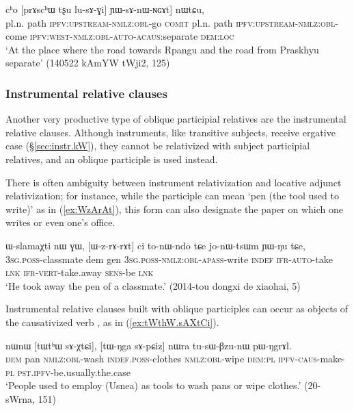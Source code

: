 \begin{exe}
\ex \label{ex:YWsAnWNGAt}
\gll   [[rpɤŋgɯ tʂu lu-sɤx-ɕe] cʰo [prɤscʰɯ tʂu lu-sɤ-ɣi] ɲɯ-sɤ-nɯ-ɴɢɤt] nɯtɕu, \\
pl.n.  path \textsc{ipfv}:\textsc{upstream}-\textsc{nmlz}:\textsc{obl}-go \textsc{comit} pl.n.  path \textsc{ipfv}:\textsc{upstream}-\textsc{nmlz}:\textsc{obl}-come \textsc{ipfv}:\textsc{west}-\textsc{nmlz}:\textsc{obl}-\textsc{auto}-\textsc{acaus}:separate \textsc{dem}:\textsc{loc} \\
\glt `At the place where the road towards Rpangu and the road from Praskhyu separate' (140522 kAmYW tWji2, 125)
\end{exe}

\subsubsection{Instrumental relative clauses} \label{sec:instrumental.participle.relatives}
Another very productive type of oblique participial relatives are the instrumental relative clauses. Although instruments, like transitive subjects, receive ergative case (§\ref{sec:instr.kW}), they cannot be relativized with subject participial relatives, and an oblique participle is used instead.

There is often ambiguity between instrument relativization and locative adjunct relativization; for instance, while the participle  can mean `pen (the tool used to write)' as in (\ref{ex:WzArAt}), this form can also designate the paper on which one writes or even one's office.

\begin{exe}
\ex \label{ex:WzArAt}
\gll ɯ-slamaχti nɯ ɣɯ, [ɯ-z-rɤ-rɤt] ci to-nɯ-ndo tɕe jo-nɯ-tsɯm ɲɯ-ŋu tɕe, \\
\textsc{3sg}.\textsc{poss}-classmate dem gen \textsc{3sg}.\textsc{poss}-\textsc{nmlz}:\textsc{obl}-\textsc{apass}-write \textsc{indef} \textsc{ifr}-\textsc{auto}-take \textsc{lnk} \textsc{ifr}-\textsc{vert}-take.away \textsc{sens}-be \textsc{lnk} \\
\glt `He took away the pen of a classmate.' (2014-tou dongxi de xiaohai, 5)
\end{exe}

Instrumental relative clauses built with oblique participles can occur as objects of the causativized verb , as in (\ref{ex:tWthW.sAXtCi}).

\begin{exe}
\ex \label{ex:tWthW.sAXtCi}
\gll nɯnɯ [tɯtʰɯ sɤ-χtɕi], [tɯ-ŋga sɤ-pɕiz] nɯra tu-sɯ-βzu-nɯ pɯ-ŋgrɤl. \\
\textsc{dem} pan \textsc{nmlz}:\textsc{obl}-wash \textsc{indef}.\textsc{poss}-clothes \textsc{nmlz}:\textsc{obl}-wipe \textsc{dem}:\textsc{pl} \textsc{ipfv}-\textsc{caus}-make-\textsc{pl} \textsc{pst}.\textsc{ipfv}-be.usually.the.case \\
\glt `People used to employ (Usnea) as tools to wash pans or wipe clothes.' (20-sWrna, 151)
\end{exe} 

